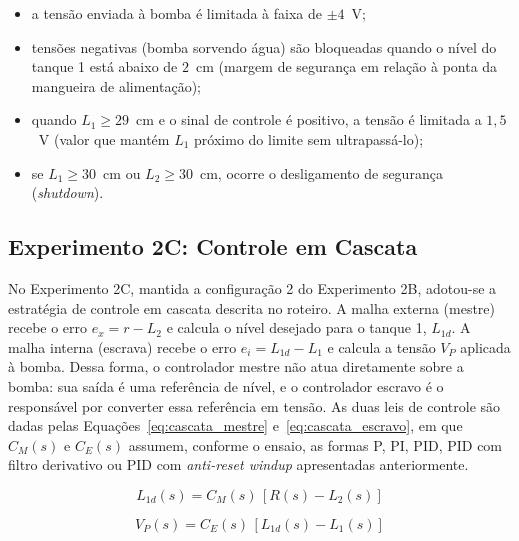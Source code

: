 \documentclass[a4paper,12pt]{article}
\begin{document}
\begin{itemize}
    \item a tensão enviada à bomba é limitada à faixa de $\pm 4$~V;
    \item tensões negativas (bomba sorvendo água) são bloqueadas quando o nível do tanque 1 está abaixo de $2$~cm (margem de segurança em relação à ponta da mangueira de alimentação);
    \item quando $L_1 \geq 29$~cm e o sinal de controle é positivo, a tensão é limitada a $1{,}5$~V (valor que mantém $L_1$ próximo do limite sem ultrapassá-lo);
    \item se $L_1 \geq 30$~cm ou $L_2 \geq 30$~cm, ocorre o desligamento de segurança (\textit{shutdown}).
\end{itemize}

\subsection{Experimento 2C: Controle em Cascata}

\begin{justify}
    \hspace{4ex}No Experimento 2C, mantida a configuração 2 do Experimento 2B, adotou-se a estratégia de controle em cascata descrita no roteiro. A malha externa (mestre) recebe o erro $e_x = r - L_2$ e calcula o nível desejado para o tanque 1, $L_{1d}$. A malha interna (escrava) recebe o erro $e_i = L_{1d} - L_1$ e calcula a tensão $V_P$ aplicada à bomba. Dessa forma, o controlador mestre não atua diretamente sobre a bomba: sua saída é uma referência de nível, e o controlador escravo é o responsável por converter essa referência em tensão. As duas leis de controle são dadas pelas Equações~\eqref{eq:cascata_mestre} e~\eqref{eq:cascata_escravo}, em que $C_M(s)$ e $C_E(s)$ assumem, conforme o ensaio, as formas P, PI, PID, PID com filtro derivativo ou PID com \textit{anti-reset windup} apresentadas anteriormente.
\end{justify}

\begin{equation}
    L_{1d}(s) = C_M(s)\,\left[R(s) - L_2(s)\right]
    \label{eq:cascata_mestre}
\end{equation}

\begin{equation}
    V_P(s) = C_E(s)\,\left[L_{1d}(s) - L_1(s)\right]
    \label{eq:cascata_escravo}
\end{equation}
\end{document}
